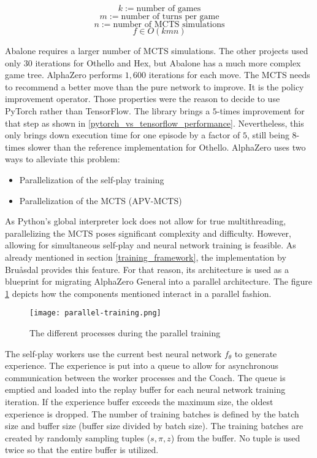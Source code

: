 $$
    k := \text{number of games}
$$
$$
    m := \text{number of turns per game}
$$
$$
    n := \text{number of MCTS simulations}
$$
$$
    f \in O(kmn)
$$

Abalone requires a larger number of MCTS simulations. The other projects \cite{bruasdal_deep_2020,thakoor_learning_nodate} used only 30 iterations for Othello and Hex, but Abalone has a much more complex game tree. AlphaZero performs $1,600$ iterations \cite[p. 11]{silver_mastering_2017} for each move. The MCTS needs to recommend a better move than the pure network to improve. It is the policy improvement operator. Those properties were the reason to decide to use PyTorch rather than TensorFlow. The library brings a $5$-times improvement for that step as shown in \ref{pytorch_vs_tensorflow_performance}. Nevertheless, this only brings down execution time for one episode by a factor of $5$, still being $8$-times slower than the reference implementation for Othello. AlphaZero uses two ways to alleviate this problem:

\begin{itemize}
    \item Parallelization of the self-play training
    \item Parallelization of the MCTS (APV-MCTS)
\end{itemize}

As Python's global interpreter lock \cite{noauthor_globalinterpreterlock_nodate} does not allow for true multithreading, parallelizing the MCTS poses significant complexity and difficulty. However, allowing for simultaneous self-play and neural network training is feasible. As already mentioned in section \ref{training_framework}, the implementation by Bruåsdal \cite{bruasdal_deep_2020} provides this feature. For that reason, its architecture is used as a blueprint for migrating AlphaZero General into a parallel architecture. The figure \ref{parallel_training_pipeline} depicts how the components mentioned interact in a parallel fashion.

\begin{figure}
    \centering
    \texttt{[image: parallel-training.png]}
    \caption{The different processes during the parallel training \cite[cf. p. 45]{bruasdal_deep_2020}}
    \label{parallel_training_pipeline}
\end{figure}

The self-play workers use the current best neural network $f_{\theta}$ to generate experience. The experience is put into a queue to allow for asynchronous communication between the worker processes and the Coach. The queue is emptied and loaded into the replay buffer for each neural network training iteration. If the experience buffer exceeds the maximum size, the oldest experience is dropped. The number of training batches is defined by the batch size and buffer size (buffer size divided by batch size). The training batches are created by randomly sampling tuples ($s, \pi, z$) from the buffer. No tuple is used twice so that the entire buffer is utilized.

